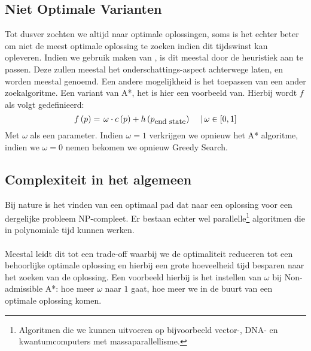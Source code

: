 \subsection{Niet Optimale Varianten}
Tot dusver zochten we altijd naar optimale oplossingen, soms is het echter beter om niet de meest optimale oplossing te zoeken indien dit tijdswinst kan opleveren. Indien we gebruik maken van , is dit meestal door de heuristiek aan te passen. Deze zullen meestal het onderschattings-aspect achterwege laten, en worden meestal  genoemd. Een andere mogelijkheid is het toepassen van een ander zoekalgoritme. Een variant van A*, het  is hier een voorbeeld van. Hierbij wordt $f$ als volgt gedefinieerd:
\begin{equation}
f\left(p\right)=\left.\omega\cdot c\left(p\right)+h\left(p_{\mbox{\small{end state}}}\right)\ \ \ \ \right|\omega\in\left[0,1\right]
\end{equation}
Met $\omega$ als een parameter. Indien $\omega=1$ verkrijgen we opnieuw het A* algoritme, indien we $\omega=0$ nemen bekomen we opnieuw Greedy Search.
\subsection{Complexiteit in het algemeen}
Bij nature is het vinden van een optimaal pad dat naar een oplossing voor een dergelijke probleem NP-compleet. Er bestaan echter wel parallelle\footnote{Algoritmen die we kunnen uitvoeren op bijvoorbeeld vector-, DNA- en kwantumcomputers met massaparallellisme.} algoritmen die in polynomiale tijd kunnen werken.%
\paragraph{}Meestal leidt dit tot een trade-off waarbij we de optimaliteit reduceren tot een behoorlijke optimale oplossing en hierbij een grote hoeveelheid tijd besparen naar het zoeken van de oplossing. Een voorbeeld hierbij is het instellen van $\omega$ bij Non-admissible A*: hoe meer $\omega$ naar $1$ gaat, hoe meer we in de buurt van een optimale oplossing komen.
